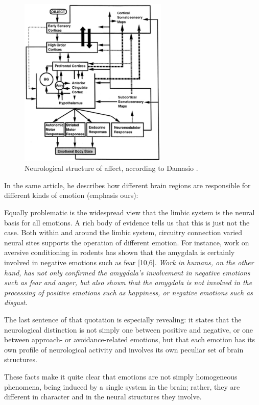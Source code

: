 \begin{figure}[t]
	\centering
	\includegraphics[width=200pt]{Figs/damasioSystem.png}
	\caption{Neurological structure of affect, according to Damasio \cite{damasio1998}.}
	\label{fig:damasioSystem}
\end{figure}

In the same article, he describes how different brain regions are responsible for different kinds of emotion (emphasis ours):

\begin{emquote}
	Equally problematic is the widespread view that the limbic system is the neural basis for all emotions. A rich body of evidence tells us that this is just not the case. Both within and around the limbic system, circuitry connection varied neural sites supports the operation of different emotion. For instance, work on aversive conditioning in rodents has shown that the amygdala is certainly involved in negative emotions such as fear [10,6]. \emph{Work in humans, on the other hand, has not only confirmed the amygdala's involvement in negative emotions such as fear and anger, but also shown that the amygdala is not involved in the processing of positive emotions such as happiness, or negative emotions such as disgust.}
\end{emquote}

The last sentence of that quotation is especially revealing: it states that the neurological distinction is not simply one between positive and negative, or one between approach- or avoidance-related emotions, but that each emotion has its own profile of neurological activity and involves its own peculiar set of brain structures.

These facts make it quite clear that emotions are not simply homogeneous phenomena, being induced by a single system in the brain; rather, they are different in character and in the neural structures they involve. 

